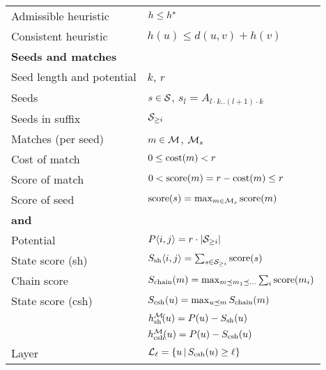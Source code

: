 \begin{table}[h]
\begin{tabular}{ll}
	\tabindent Admissible heuristic & $h \leq h^*\!$\\
	\tabindent Consistent heuristic & $h(u) \leq d(u,v) + h(v)$\\
	\hline
	\multicolumn{2}{l}{\textbf{Seeds and matches}} \\
	\tabindent Seed length and potential & $k$, $r$ \\
	\tabindent Seeds & $s\in \mathcal S$, $s_l = A_{l \cdot k..(l+1)\cdot k}$ \\
	\tabindent Seeds in suffix & $\mathcal S_{\geq i}$ \\
	\tabindent Matches (per seed)& $m \in \mathcal M$, $\mathcal M_s$\\
	\tabindent Cost of match & $0 \leq \operatorname{cost}(m) < r$\\
	\tabindent Score of match & $0 < \operatorname{score}(m) = r - \operatorname{cost}(m) \leq r$\\
	\tabindent Score of seed & $\operatorname{score}(s) = \max_{m\in \mathcal M_s} \operatorname{score}(m)$\\
	\hline
	\multicolumn{2}{l}{\textbf{\Sh and \csh}} \\
	\tabindent Potential & $P\langle i, j \rangle  = r \cdot |\mathcal S_{\geq i}|$ \\
	\tabindent State score (sh) &
							 $S_{\mathrm{sh}} \langle i, j \rangle = \sum_{s\in \mathcal S_{\geq i}} \operatorname{score}(s)$ \\
	\tabindent Chain score & $S_{\mathrm{chain}}(m) = \max_{m\preceq m_1 \preceq \dots} \sum_i \operatorname{score}(m_i)$\\
	\tabindent State score (csh) & $S_{\mathrm{csh}}(u) = \max_{u\preceq m} S_{\mathrm{chain}}(m)$\\
	\tabindent \Sh & $h_{\mathrm{sh}}^\mathcal M\!(u) = P(u) - S_{\mathrm{sh}}(u)$\\
	\tabindent \Csh & $h_{\mathrm{csh}}^\mathcal M\!(u) = P(u) - S_{\mathrm{csh}}(u)$\\
	\tabindent Layer & $\mathcal L_\ell = \{u\, | \, S_{\mathrm{csh}}(u) \geq \ell\}$
  \end{tabular}
\end{table}

